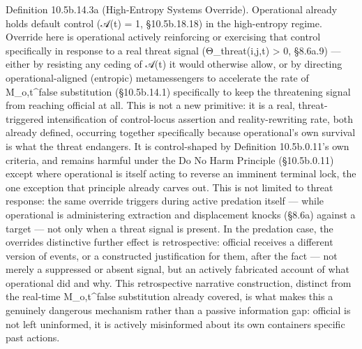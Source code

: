 \documentclass[
]{article}
\begin{document}
Definition 10.5b.14.3a (High-Entropy Systems Override). Operational
already holds default control (𝒜(t) = 1, §10.5b.18.18) in the
high-entropy regime. Override here is operational actively reinforcing
or exercising that control specifically in response to a real threat
signal (Θ\_threat(i,j,t) \textgreater{} 0, §8.6a.9) --- either by
resisting any ceding of 𝒜(t) it would otherwise allow, or by directing
operational-aligned (entropic) metamessengers to accelerate the rate of
M\_o,t\^{}false substitution (§10.5b.14.1) specifically to keep the
threatening signal from reaching official at all. This is not a new
primitive: it is a real, threat-triggered intensification of
control-locus assertion and reality-rewriting rate, both already
defined, occurring together specifically because operational's own
survival is what the threat endangers. It is control-shaped by
Definition 10.5b.0.11's own criteria, and remains harmful under the Do No
Harm Principle (§10.5b.0.11) except where operational is itself acting
to reverse an imminent terminal lock, the one exception that principle
already carves out. This is not limited to threat response: the same
override triggers during active predation itself --- while operational
is administering extraction and displacement knocks (§8.6a) against a
target --- not only when a threat signal is present. In the predation
case, the overrides distinctive further effect is retrospective:
official receives a different version of events, or a constructed
justification for them, after the fact --- not merely a suppressed or
absent signal, but an actively fabricated account of what operational
did and why. This retrospective narrative construction, distinct from
the real-time M\_o,t\^{}false substitution already covered, is what
makes this a genuinely dangerous mechanism rather than a passive
information gap: official is not left uninformed, it is actively
misinformed about its own containers specific past actions.
\end{document}

